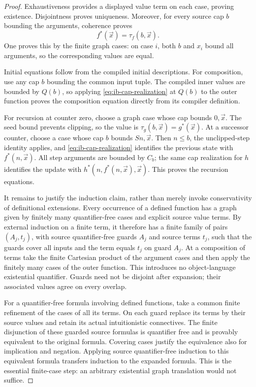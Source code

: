 \begin{proof}
Exhaustiveness provides a displayed value term on each case, proving
existence.  Disjointness proves uniqueness.  Moreover, for every
source cap $b$ bounding the arguments, coherence proves
\[
                              f^*(\vec x)=\tau_f(b,\vec x).
 \tag{Cap realization}\label{eq:ib-cap-realization}
\]
One proves this by the finite graph cases: on case $i$, both $b$ and
$x_i$ bound all arguments, so the corresponding values are equal.

Initial equations follow from the compiled initial descriptions.
For composition, use any cap $b$ bounding the common input tuple.
The compiled inner values are bounded by $Q(b)$, so applying
\eqref{eq:ib-cap-realization} at $Q(b)$ to the outer function proves
the composition equation directly from its compiler definition.

For recursion at counter zero, choose a graph case whose cap bounds
$0,\vec x$.  The seed bound prevents clipping, so the value is
$\tau_g(b,\vec x)=g^*(\vec x)$.  At a successor counter, choose a
case whose cap $b$ bounds $Sn,\vec x$.  Then $n\leq b$,
the unclipped-step identity applies, and
\eqref{eq:ib-cap-realization} identifies the previous state with
$f^*(n,\vec x)$.  All step arguments are bounded by $C_b$; the same
cap realization for $h$ identifies the update with
$h^*(n,f^*(n,\vec x),\vec x)$.  This proves the recursion equations.

It remains to justify the induction claim, rather than merely invoke
conservativity of definitional extensions.  Every occurrence of a
defined function has a graph given by finitely many quantifier-free
cases and explicit source value terms.  By external induction on a
finite term, it therefore has a finite family of pairs
$(A_j,t_j)$, with source quantifier-free guards $A_j$ and source
terms $t_j$, such that the guards cover all inputs and the term equals
$t_j$ on guard $A_j$.  At a composition of terms take the finite
Cartesian product of the argument cases and then apply the finitely
many cases of the outer function.  This introduces no object-language
existential quantifier.  Guards need not be disjoint after expansion;
their associated values agree on every overlap.

For a quantifier-free formula involving defined functions, take a
common finite refinement of the cases of all its terms.  On each
guard replace its terms by their source values and retain its actual
intuitionistic connectives.  The finite disjunction of these guarded
source formulas is quantifier free and is provably equivalent to the
original formula.  Covering cases justify the equivalence also for
implication and negation.  Applying source quantifier-free induction
to this equivalent formula transfers induction to the expanded
formula.  This is the essential finite-case step: an arbitrary
existential graph translation would not suffice.
\end{proof}

